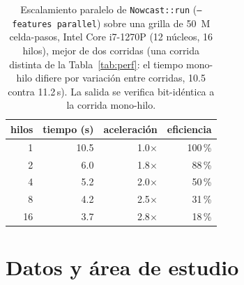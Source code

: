 \documentclass[authoryear,preprint,review,12pt]{elsarticle}
\begin{document}
\begin{table}[ht]
\centering
\caption{Escalamiento paralelo de \texttt{Nowcast::run} (\texttt{--features parallel})
sobre una grilla de 50~M celda-pasos, Intel Core i7-1270P (12 núcleos, 16 hilos), mejor de dos corridas (una corrida distinta
de la Tabla~\ref{tab:perf}: el tiempo mono-hilo difiere por variación entre corridas, 10.5 contra 11.2\,s).
La salida se verifica bit-idéntica a la corrida mono-hilo.}
\label{tab:scaling}
\begin{tabular}{@{}rrrr@{}}
\toprule
hilos & tiempo (s) & aceleración & eficiencia \\
\midrule
1  & 10.5 & 1.0$\times$ & 100\,\% \\
2  & 6.0  & 1.8$\times$ & 88\,\% \\
4  & 5.2  & 2.0$\times$ & 50\,\% \\
8  & 4.2  & 2.5$\times$ & 31\,\% \\
16 & 3.7  & 2.8$\times$ & 18\,\% \\
\bottomrule
\end{tabular}
\end{table}

\section{Datos y área de estudio}
\end{document}
